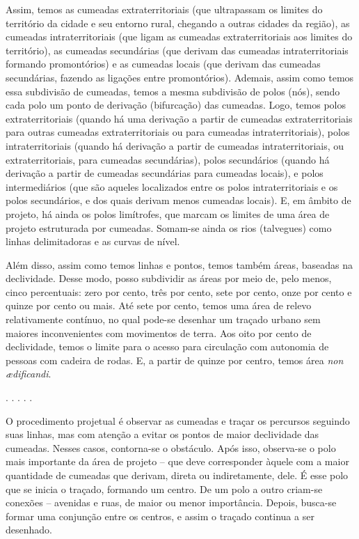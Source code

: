 \documentclass[12pt, a4paper]{book} %
\begin{document}
        Assim, temos as cumeadas extraterritoriais (que ultrapassam os limites do território da cidade e seu entorno rural, chegando a outras cidades da região), as cumeadas intraterritoriais (que ligam as cumeadas extraterritoriais aos limites do território), as cumeadas secundárias (que derivam das cumeadas intraterritoriais formando promontórios) e as cumeadas locais (que derivam das cumeadas secundárias, fazendo as ligações entre promontórios). Ademais, assim como temos essa subdivisão de cumeadas, temos a mesma subdivisão de polos (nós), sendo cada polo um ponto de derivação (bifurcação) das cumeadas. Logo, temos polos extraterritoriais (quando há uma derivação a partir de cumeadas extraterritoriais para outras cumeadas extraterritoriais ou para cumeadas intraterritoriais), polos intraterritoriais (quando há derivação a partir de cumeadas intraterritoriais, ou extraterritoriais, para cumeadas secundárias), polos secundários (quando há derivação a partir de cumeadas secundárias para cumeadas locais), e polos intermediários (que são aqueles localizados entre os polos intraterritoriais e os polos secundários, e dos quais derivam menos cumeadas locais). E, em âmbito de projeto, há ainda os polos limítrofes, que marcam os limites de uma área de projeto estruturada por cumeadas. Somam-se ainda os rios (talvegues) como linhas delimitadoras e as curvas de nível.

        Além disso, assim como temos linhas e pontos, temos também áreas, baseadas na declividade. Desse modo, posso subdividir as áreas por meio de, pelo menos, cinco percentuais: zero por cento, três por cento, sete por cento, onze por cento e quinze por cento ou mais. Até sete por cento, temos uma área de relevo relativamente contínuo, no qual pode-se desenhar um traçado urbano sem maiores inconvenientes com movimentos de terra. Aos oito por cento de declividade, temos o limite para o acesso para circulação com autonomia de pessoas com cadeira de rodas. E, a partir de quinze por centro, temos área \textit{non ædificandi}. 

        \begin{center}
            . . . . .
        \end{center}  

        O procedimento projetual é observar as cumeadas e traçar os percursos seguindo suas linhas, mas com atenção a evitar os pontos de maior declividade das cumeadas. Nesses casos, contorna-se o obstáculo. Após isso, observa-se o polo mais importante da área de projeto – que deve corresponder àquele com a maior quantidade de cumeadas que derivam, direta ou indiretamente, dele. É esse polo que se inicia o traçado, formando um centro. De um polo a outro criam-se conexões – avenidas e ruas, de maior ou menor importância. Depois, busca-se formar uma conjunção entre os centros, e assim o traçado continua a ser desenhado.
\end{document}
